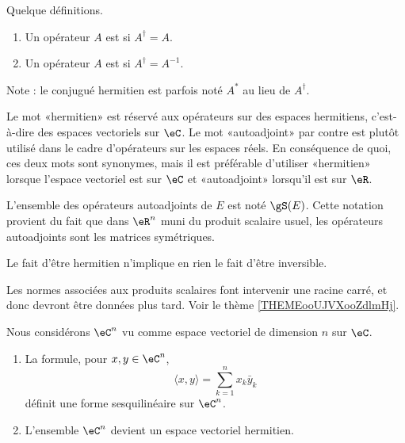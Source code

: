 \begin{definition}      \label{DEFooKEBHooWwCKRK}
	Quelque définitions.
	\begin{enumerate}
		\item
		      Un opérateur \( A\) est  si \( A^{\dag}=A\).
		\item
		      Un opérateur \( A\) est  si \( A^{\dag}=A^{-1}\).
	\end{enumerate}
	Note : le conjugué hermitien est parfois noté \( A^*\) au lieu de \( A^{\dag}\).
\end{definition}

\begin{normaltext}
	Le mot «hermitien» est réservé aux opérateurs sur des espaces hermitiens, c'est-à-dire des espaces vectoriels sur \( \eC\). Le mot «autoadjoint» par contre est plutôt utilisé dans le cadre d'opérateurs sur les espaces réels. En conséquence de quoi, ces deux mots sont synonymes, mais il est préférable d'utiliser «hermitien» lorsque l'espace vectoriel est sur \( \eC\) et «autoadjoint» lorsqu'il est sur \( \eR\).

	L'ensemble des opérateurs autoadjoints de \( E\) est noté \( \gS(E)\). Cette notation provient du fait que dans \( \eR^n\) muni du produit scalaire usuel, les opérateurs autoadjoints sont les matrices symétriques.
\end{normaltext}

\begin{remark}
	Le fait d'être hermitien n'implique en rien le fait d'être inversible.
\end{remark}

\begin{normaltext}
	Les normes associées aux produits scalaires font intervenir une racine carré, et donc devront être données plus tard. Voir le thème \ref{THEMEooUJVXooZdlmHj}.
\end{normaltext}

\begin{proposition}      \label{PROPooMWUCooMbJuaJ}
	Nous considérons \(\eC^n\) vu comme espace vectoriel de dimension \( n\) sur \( \eC\).
	\begin{enumerate}
		\item
		      La formule, pour \( x,y\in \eC^n\),
		      \begin{equation}    \label{EqFormSesqQrjyPH}
			      \langle x, y\rangle =\sum_{k=1}^nx_k\bar y_k
		      \end{equation}
		      définit une forme sesquilinéaire sur \( \eC^n\).
		\item
		      L'ensemble \( \eC^n\) devient un espace vectoriel hermitien.
	\end{enumerate}
\end{proposition}

